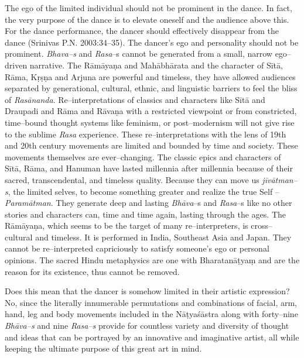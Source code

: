 The ego of the limited individual should not be prominent in the dance. In fact, the very purpose of the dance is to elevate oneself and the audience above this. For the dance performance, the dancer should effectively disappear from the dance (Srinivas P.N. 2003:34–35). The dancer’s ego and personality should not be prominent. \textit{Bhava–s} and \textit{Rasa}–s cannot be generated from a small, narrow ego–driven narrative. The Rāmāyaṇa and Mahābhārata and the character of Sītā, Rāma, Kṛṣṇa and Arjuna are powerful and timeless, they have allowed audiences separated by generational, cultural, ethnic, and linguistic barriers to feel the bliss of \textit{Rasānanda}. Re–interpretations of classics and characters like Sītā and Draupadi and Rāma and Rāvaṇa with a restricted viewpoint or from constricted, time–bound thought systems like feminism, or post–modernism will not give rise to the sublime \textit{Rasa} experience. These re–interpretations with the lens of 19th and 20th century movements are limited and bounded by time and society. These movements themselves are ever–changing. The classic epics and characters of Sītā, Rāma, and Hanuman have lasted millennia after millennia because of their sacred, transcendental, and timeless quality. Because they can move us \textit{jīvātman–s}, the limited selves, to become something greater and realize the true Self – \textit{Paramātman}. They generate deep and lasting \textit{Bhāva}–s and \textit{Rasa}–s like no other stories and characters can, time and time again, lasting through the ages. The Rāmāyaṇa, which seems to be the target of many re–interpreters, is cross–cultural and timeless. It is performed in India, Southeast Asia and Japan. They cannot be re–interpreted capriciously to satisfy someone’s ego or personal opinions. The sacred Hindu metaphysics are one with Bharatanāṭyaṃ and are the reason for its existence, thus cannot be removed.

\vskip -2pt

Does this mean that the dancer is somehow limited in their artistic expression? No, since the literally innumerable permutations and combinations of facial, arm, hand, leg and body movements included in the Nāṭyaśāstra along with forty–nine \textit{Bhāva–s} and nine \textit{Rasa–s} provide for countless variety and diversity of thought and ideas that can be portrayed by an innovative and imaginative artist, all while keeping the ultimate purpose of this great art in mind. 

